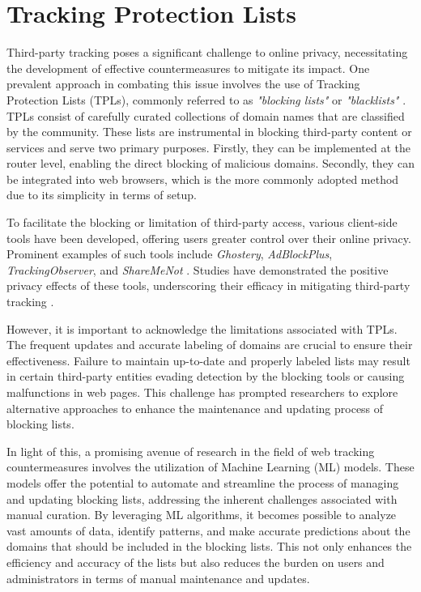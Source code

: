 \section{Tracking Protection Lists}

Third-party tracking poses a significant challenge to online privacy, necessitating the development of effective countermeasures
to mitigate its impact. One prevalent approach in combating this issue involves the use of Tracking Protection Lists (TPLs),
commonly referred to as \textit{"blocking lists"} or \textit{"blacklists"} \cite{bujlow2017survey,mayer2012third}. TPLs consist of carefully curated collections of domain names
that are classified by the community. These lists are instrumental in blocking third-party content or services and serve two
primary purposes. Firstly, they can be implemented at the router level, enabling the direct blocking of malicious domains.
Secondly, they can be integrated into web browsers, which is the more commonly adopted method due to its simplicity in terms of setup.

To facilitate the blocking or limitation of third-party access, various client-side tools have been developed, offering users greater
control over their online privacy. Prominent examples of such tools include \textit{Ghostery}, \textit{AdBlockPlus}, \textit{TrackingObserver}, and \textit{ShareMeNot}
\cite{ghostery, abp, trackingObserver, shareMeNot}.
Studies have demonstrated the positive privacy effects of these tools, underscoring their efficacy in mitigating third-party tracking \cite{kontaxis2015tracking}.

However, it is important to acknowledge the limitations associated with TPLs. The frequent updates and accurate labeling of domains are crucial
to ensure their effectiveness. Failure to maintain up-to-date and properly labeled lists may result in certain third-party entities evading detection
by the blocking tools or causing malfunctions in web pages. This challenge has prompted researchers to explore alternative approaches to enhance
the maintenance and updating process of blocking lists.

In light of this, a promising avenue of research in the field of web tracking countermeasures involves the utilization of Machine Learning (ML)
models. These models offer the potential to automate and streamline the process of managing and updating blocking lists, addressing the inherent
challenges associated with manual curation. By leveraging ML algorithms, it becomes possible to analyze vast amounts of data,
identify patterns, and make accurate predictions about the domains that should be included in the blocking lists. This not only enhances the efficiency
and accuracy of the lists but also reduces the burden on users and administrators in terms of manual maintenance and updates.

